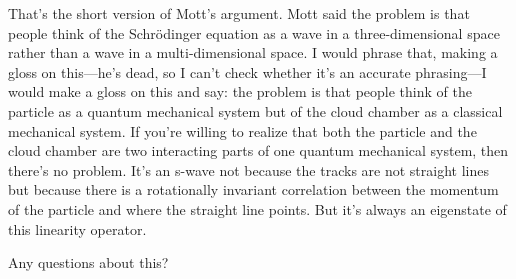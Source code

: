 \documentclass[12pt,nofootinbib]{revtex4}
\begin{document}
That's the short version of Mott's argument. Mott said the problem is that people think of the Schrödinger equation as a wave in a three-dimensional space rather than a wave in a multi-dimensional space. I would phrase that, making a gloss on this---he's dead, so I can't check whether it's an accurate phrasing---I would make a gloss on this and say: the problem is that people think of the particle as a quantum mechanical system but of the cloud chamber as a classical mechanical system. If you're willing to realize that both the particle and the cloud chamber are two interacting parts of one quantum mechanical system, then there's no problem. It's an s-wave not because the tracks are not straight lines but because there is a rotationally invariant correlation between the momentum of the particle and where the straight line points. But it's always an eigenstate of this linearity operator.

Any questions about this?
\end{document}
